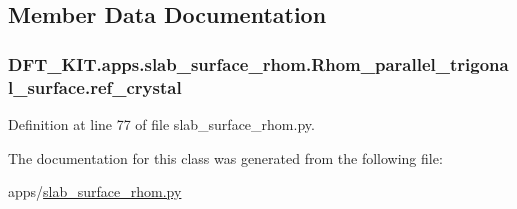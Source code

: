 \subsection{Member Data Documentation}
\hypertarget{class_d_f_t___k_i_t_1_1apps_1_1slab__surface__rhom_1_1_rhom__parallel__trigonal__surface_a42ef9900bdc7c47e6a52f6a5fed01e94}{
\subsubsection[{ref\+\_\+crystal}]{\setlength{\rightskip}{0pt plus 5cm}D\+F\+T\+\_\+\+K\+I\+T.\+apps.\+slab\+\_\+surface\+\_\+rhom.\+Rhom\+\_\+parallel\+\_\+trigonal\+\_\+surface.\+ref\+\_\+crystal}}\label{class_d_f_t___k_i_t_1_1apps_1_1slab__surface__rhom_1_1_rhom__parallel__trigonal__surface_a42ef9900bdc7c47e6a52f6a5fed01e94}


Definition at line 77 of file slab\+\_\+surface\+\_\+rhom.\+py.



The documentation for this class was generated from the following file\+:\begin{DoxyCompactItemize}
\item 
apps/\hyperlink{slab__surface__rhom_8py}{slab\+\_\+surface\+\_\+rhom.\+py}\end{DoxyCompactItemize}
